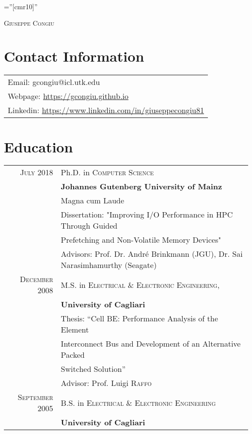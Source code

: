 \documentclass[a4paper,10pt]{article}
\begin{document}
\pagestyle{empty} %

\font\fb=''[cmr10]'' %

\par{\centering
    {\Huge \textsc{Giuseppe Congiu}
}\bigskip\par}

\section{Contact Information}

\begin{tabular}{l}
    Email: gcongiu@icl.utk.edu \\
    Webpage: \url{https://gcongiu.github.io} \\
    Linkedin: \url{https://www.linkedin.com/in/giuseppecongiu81}
\end{tabular}

\section{Education}
\begin{tabular}{rp{11cm}}
\textsc{July 2018} & Ph.D. in \textsc{Computer Science}\\
          & \textbf{Johannes Gutenberg University of Mainz} \\
          & Magna cum Laude \\
          & Dissertation: "Improving I/O Performance in HPC Through Guided\\
          & Prefetching and Non-Volatile Memory Devices"\\
          & \small Advisors: Prof. Dr. Andr\'e Brinkmann (JGU), Dr. Sai Narasimhamurthy (Seagate)\\

\textsc{December} 2008 & M.S. in \textsc{Electrical \& Electronic Engineering}, \\
              & \textbf{University of Cagliari}\\
              & Thesis: ``Cell BE: Performance Analysis of the Element\\
              & Interconnect Bus and Development of an Alternative Packed\\
              & Switched Solution'' \\
              & \small Advisor: Prof. Luigi \textsc{Raffo}\\

\textsc{September} 2005 & B.S. in \textsc{Electrical \& Electronic Engineering} \\
               & \textbf{University of Cagliari}\\
\end{tabular}
\end{document}
